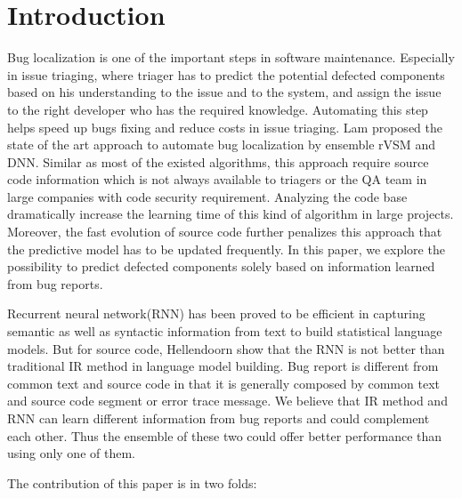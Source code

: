 \section{Introduction}
Bug localization is one of the important steps in software maintenance.
Especially in issue triaging, where triager has to predict the potential defected components based on his understanding to the issue and to the system, and assign the issue to the right developer who has the required knowledge.
Automating this step helps speed up bugs fixing and reduce costs in issue triaging.
Lam \etal\cite{lam2017bug} proposed the state of the art approach to automate bug localization by ensemble rVSM\cite{zhou2012should} and DNN.  
Similar as most of the existed algorithms, this approach require source code information which is not always available to triagers or the QA team in large companies with code security requirement.
Analyzing the code base dramatically increase the learning time of this kind of algorithm in large projects.
Moreover, the fast evolution of source code further penalizes this approach that the predictive model has to be updated frequently.   
In this paper, we explore the possibility to predict defected components solely based on information learned from bug reports.

Recurrent neural network(RNN) has been proved to be efficient in capturing semantic as well as syntactic information from text to build statistical language models.
But for source code, Hellendoorn \etal show that the RNN is not better than traditional IR method in language model building\cite{hellendoorn2017deep}.
Bug report is different from common text and source code in that it is generally composed by common text and source code segment or error trace message. 
We believe that IR method and RNN can learn different information from bug reports and could complement each other.
Thus the ensemble of these two could offer better performance than using only one of them.

The contribution of this paper is in two folds:  
